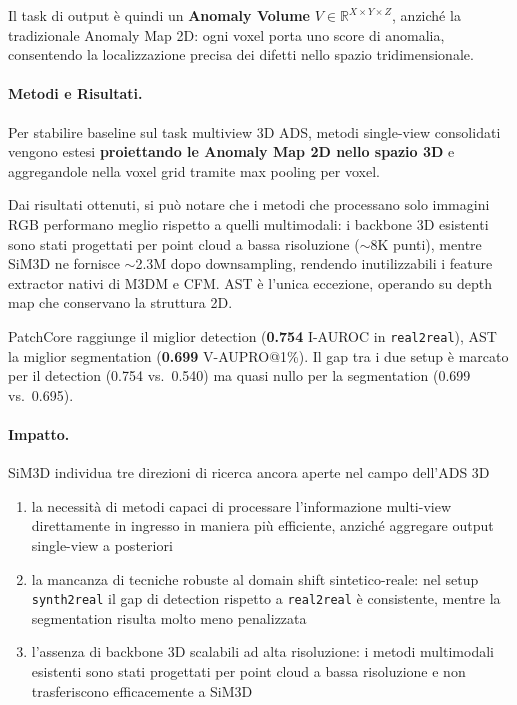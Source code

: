 Il task di output è quindi un \textbf{Anomaly Volume} $V \in \mathbb{R}^{X \times Y \times Z}$, anziché la tradizionale Anomaly Map 2D: ogni voxel porta uno score di anomalia, consentendo la localizzazione precisa dei difetti nello spazio tridimensionale.

\paragraph{Metodi e Risultati.}
Per stabilire baseline sul task multiview 3D ADS, me\-to\-di single-view consolidati vengono estesi \textbf{proiettando le Anomaly Map 2D nello spazio 3D} e aggregandole nella voxel grid tramite max pooling per voxel. 

Dai risultati ottenuti, si può notare che i metodi che processano solo immagini RGB performano meglio rispetto a quelli multimodali: i backbone 3D esistenti sono stati progettati per point cloud a bassa risoluzione ($\sim$8K punti), mentre SiM3D ne fornisce $\sim$2.3M dopo downsampling, rendendo inutilizzabili i feature extractor nativi di M3DM e CFM. AST è l'unica eccezione, operando su depth map che conservano la struttura 2D. 

PatchCore raggiunge il miglior detection (\textbf{0.754} I-AUROC in \texttt{real2real}), AST la miglior segmentation (\textbf{0.699} V-AUPRO@1\%). Il gap tra i due setup è marcato per il detection (0.754 vs.\ 0.540) ma quasi nullo per la segmentation (0.699 vs.\ 0.695).

\paragraph{Impatto.}
SiM3D individua tre direzioni di ricerca ancora aperte nel campo dell'ADS 3D
\begin{enumerate}
    \item la necessità di metodi capaci di processare l'informazione multi-view direttamente in ingresso in maniera più efficiente, anziché aggregare output single-view a posteriori
    \item la mancanza di tecniche robuste al domain shift sintetico-reale: nel setup \texttt{synth2real} il gap di detection rispetto a \texttt{real2real} è consistente, mentre la segmentation risulta molto meno penalizzata
    \item l'assenza di backbone 3D scalabili ad alta risoluzione: i metodi multimodali esistenti sono stati progettati per point cloud a bassa risoluzione e non trasferiscono efficacemente a SiM3D
\end{enumerate}

